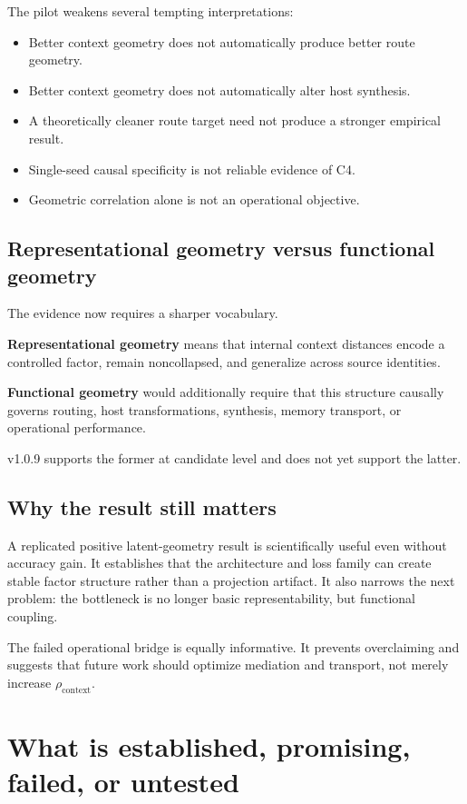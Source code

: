 \documentclass[11pt,a4paper]{article}
\begin{document}
The pilot weakens several tempting interpretations:

\begin{itemize}
\item Better context geometry does not automatically produce better route geometry.
\item Better context geometry does not automatically alter host synthesis.
\item A theoretically cleaner route target need not produce a stronger empirical result.
\item Single-seed causal specificity is not reliable evidence of C4.
\item Geometric correlation alone is not an operational objective.
\end{itemize}

\subsection{Representational geometry versus functional geometry}

The evidence now requires a sharper vocabulary.

\textbf{Representational geometry} means that internal context distances encode a controlled factor, remain noncollapsed, and generalize across source identities.

\textbf{Functional geometry} would additionally require that this structure causally governs routing, host transformations, synthesis, memory transport, or operational performance.

v1.0.9 supports the former at candidate level and does not yet support the latter.

\subsection{Why the result still matters}

A replicated positive latent-geometry result is scientifically useful even without accuracy gain. It establishes that the architecture and loss family can create stable factor structure rather than a projection artifact. It also narrows the next problem: the bottleneck is no longer basic representability, but functional coupling.

The failed operational bridge is equally informative. It prevents overclaiming and suggests that future work should optimize mediation and transport, not merely increase $\rho_{\mathrm{context}}$.

\section{What is established, promising, failed, or untested}
\end{document}
